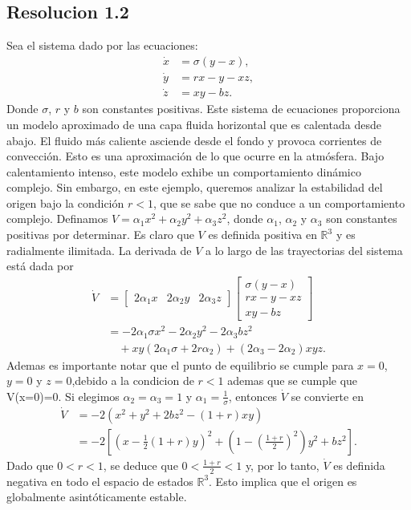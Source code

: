 \documentclass[
  11pt,
  letterpaper,
   addpoints,
   answers
  ]{exam}
\begin{document}
\begin{questions}
\begin{solution}
    \subsection*{Resolucion 1.2}
    Sea el sistema dado por las ecuaciones:
    \begin{align}
        \dot{x} &= \sigma (y - x), \\
        \dot{y} &= r x - y - x z, \\
        \dot{z} &= x y - b z.
    \end{align}
    Donde \( \sigma \), \( r \) y \( b \) son constantes positivas. Este sistema de ecuaciones proporciona un modelo aproximado de una capa fluida horizontal que es calentada desde abajo. El fluido más caliente asciende desde el fondo y provoca corrientes de convección. Esto es una aproximación de lo que ocurre en la atmósfera. Bajo calentamiento intenso, este modelo exhibe un comportamiento dinámico complejo. Sin embargo, en este ejemplo, queremos analizar la estabilidad del origen bajo la condición \( r < 1 \), que se sabe que no conduce a un comportamiento complejo. Definamos \( V = \alpha_1 x^2 + \alpha_2 y^2 + \alpha_3 z^2 \), donde \( \alpha_1 \), \( \alpha_2 \) y \( \alpha_3 \) son constantes positivas por determinar. Es claro que \( V \) es definida positiva en \( \mathbb{R}^3 \) y es radialmente ilimitada. La derivada de \( V \) a lo largo de las trayectorias del sistema está dada por
    \begin{align}
        \dot{V} &= \begin{bmatrix} 2\alpha_1 x & 2\alpha_2 y & 2\alpha_3 z \end{bmatrix} 
        \begin{bmatrix} 
        \sigma (y - x) \\ 
        r x - y - x z \\ 
        x y - b z 
        \end{bmatrix} \\
        &= -2\alpha_1 \sigma x^2 - 2\alpha_2 y^2 - 2\alpha_3 b z^2 \\
        & \quad + x y (2\alpha_1 \sigma + 2r \alpha_2) + (2\alpha_3 - 2\alpha_2) x y z.
    \end{align}
    Ademas es importante notar que el punto de equilibrio se cumple para $x=0$, $y=0$ y $z=0$,debido a la condicion de $r<1$ ademas que se cumple que V(x=0)=0.
    Si elegimos \( \alpha_2 = \alpha_3 = 1 \) y \( \alpha_1 = \frac{1}{\sigma} \), entonces \( \dot{V} \) se convierte en
    \begin{align}
        \dot{V} &= -2 \left( x^2 + y^2 + 2bz^2 - (1 + r)xy \right) \\
        &= -2 \left[ \left( x - \frac{1}{2}(1 + r)y \right)^2 + \left( 1 - \left( \frac{1 + r}{2} \right)^2 \right)y^2 + b z^2 \right].
    \end{align}
Dado que \( 0 < r < 1 \), se deduce que \( 0 < \frac{1 + r}{2} < 1 \) y, por lo tanto, \( \dot{V} \) es definida negativa en todo el espacio de estados \( \mathbb{R}^3 \). Esto implica que el origen es globalmente asintóticamente estable.

\end{solution}
\end{questions}
\end{document}
